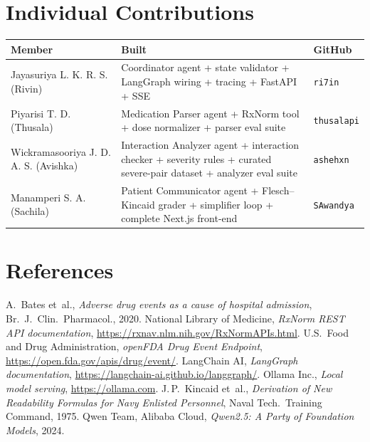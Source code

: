 \documentclass[11pt]{article}
\begin{document}
\section*{Individual Contributions}\label{contrib}

\begin{tabularx}{\linewidth}{l Y l}
\toprule
\textbf{Member}                              & \textbf{Built} & \textbf{GitHub} \\
\midrule
Jayasuriya L. K. R. S. (Rivin)        & Coordinator agent + state validator + LangGraph wiring + tracing + FastAPI + SSE & \texttt{ri7in} \\
Piyarisi T. D. (Thusala)              & Medication Parser agent + RxNorm tool + dose normalizer + parser eval suite      & \texttt{thusalapi} \\
Wickramasooriya J. D. A. S. (Avishka) & Interaction Analyzer agent + interaction checker + severity rules + curated severe-pair dataset + analyzer eval suite & \texttt{ashehxn} \\
Manamperi S. A. (Sachila)             & Patient Communicator agent + Flesch–Kincaid grader + simplifier loop + complete Next.js front-end & \texttt{SAwandya} \\
\bottomrule
\end{tabularx}

\section*{References}\label{refs}

{\small
\begin{thebibliography}{9}
  \setlength{\itemsep}{1pt}\setlength{\parsep}{0pt}
 A.~Bates et~al., \emph{Adverse drug events as a cause of hospital admission}, Br.~J.~Clin.~Pharmacol., 2020.
 National Library of Medicine, \emph{RxNorm REST API documentation}, \url{https://rxnav.nlm.nih.gov/RxNormAPIs.html}.
 U.S.~Food and Drug Administration, \emph{openFDA Drug Event Endpoint}, \url{https://open.fda.gov/apis/drug/event/}.
 LangChain AI, \emph{LangGraph documentation}, \url{https://langchain-ai.github.io/langgraph/}.
 Ollama Inc., \emph{Local model serving}, \url{https://ollama.com}.
 J.\,P.~Kincaid et~al., \emph{Derivation of New Readability Formulas for Navy Enlisted Personnel}, Naval Tech.\ Training Command, 1975.
 Qwen Team, Alibaba Cloud, \emph{Qwen2.5: A Party of Foundation Models}, 2024.
\end{thebibliography}
}
\end{document}
